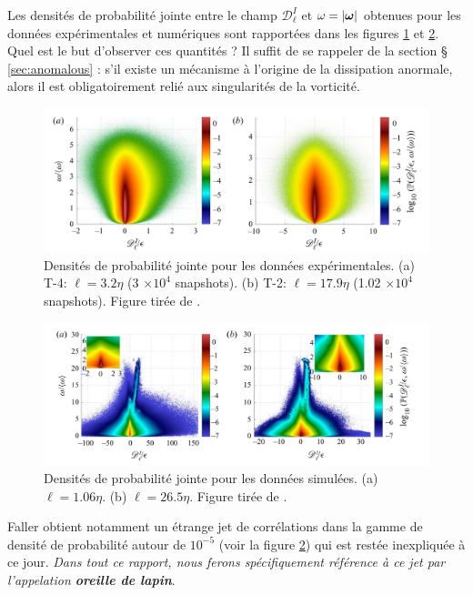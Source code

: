 \documentclass[13pt, a4paper]{extarticle}
\begin{document}
Les densités de probabilité jointe entre le champ 
$\mathscr{D}^I_\ell$ et $\omega=|\boldsymbol{\omega}|$ obtenues pour les données expérimentales 
et numériques sont rapportées dans les figures \ref{fig:joint_exp} et \ref{fig:joint_faller}.
Quel est le but d'observer ces quantités ? Il suffit de se rappeler de la section \S
\ref{sec:anomalous} : s'il existe un mécanisme à l'origine de la dissipation anormale,
alors il est obligatoirement relié aux singularités de la vorticité.
\begin{figure}[h]
  \centering
  \includegraphics[width=.95\linewidth]{figs/pdf_exp.png}
  \caption[Densités de probabilité jointe pour les données expérimentales de \cite{Faller-Intermittency}]
  {Densités de probabilité jointe pour les données expérimentales.
  (a) T-4: $\ell= 3.2\eta$ (3 $\times 10^4$ snapshots). (b) T-2: 
  $\ell = 17.9\eta$ (1.02 $\times 10^4$ snapshots). Figure tirée de \cite{Faller-Intermittency}.}
  \label{fig:joint_exp}
\end{figure}
\begin{figure}[h]
  \centering
  \includegraphics[width=.95\linewidth]{figs/pdf_dns.png}
  \caption[Densités de probabilité jointe pour les données simulées de \cite{Faller-Intermittency}]
  {Densités de probabilité jointe pour les données simulées.
  (a) $\ell= 1.06\eta$. (b) $\ell = 26.5\eta$. Figure tirée de \cite{Faller-Intermittency}.} 
  \label{fig:joint_faller}
\end{figure}
Faller obtient notamment un étrange jet de corrélations dans la gamme de densité 
de probabilité autour de $10^{-5}$ (voir la figure \ref{fig:joint_faller}) qui est restée inexpliquée à ce jour.
\emph{Dans tout ce rapport, nous ferons spécifiquement r\'ef\'erence \`a ce jet par l'appelation 
{\bf oreille de lapin}}.
\end{document}
